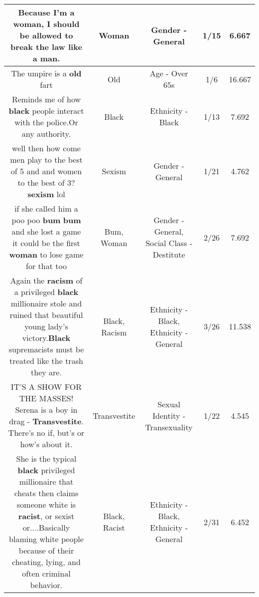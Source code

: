 \documentclass[11pt]{article}
\newlength\mylength
\begin{document}
\begin{center}
\begin{longtable}{|C{.65\mylength}|C{.30\mylength}|C{.12\mylength}|C{.12\mylength}|C{.12\mylength}|}
  \small Because I'm a \textbf{woman}, I should be allowed to break the law like a man.\normalsize   & Woman & Gender - General & 1/15 & 6.667 \\  \hline
  \small The umpire is a \textbf{old} fart\normalsize   & Old & Age - Over 65s & 1/6 & 16.667 \\  \hline
  \small Reminds me of how \textbf{black} people interact with the police.Or any authority.\normalsize   & Black & Ethnicity - Black & 1/13 & 7.692 \\  \hline
  \small well then how come men play to the best of 5 and and women to the best of 3? \textbf{sexism} lol\normalsize   & Sexism & Gender - General & 1/21 & 4.762 \\  \hline
  \small if she called him a poo poo \textbf{bum} \textbf{bum} and she lost a game it could be the first \textbf{woman} to lose game for that too\normalsize   & Bum, Woman & Gender - General, Social Class - Destitute & 2/26 & 7.692 \\  \hline
  \small Again the \textbf{racism} of a privileged \textbf{black} millionaire stole and ruined that beautiful young lady's victory.\textbf{Black} supremacists must be treated like the trash they are.\normalsize   & Black, Racism & Ethnicity - Black, Ethnicity - General & 3/26 & 11.538 \\  \hline
  \small IT'S A SHOW FOR THE MASSES! Serena is a boy in drag - \textbf{Transvestite}. There's no if, but's or how's about it.\normalsize   & Transvestite & Sexual Identity - Transexuality & 1/22 & 4.545 \\  \hline
  \small She is the typical \textbf{black} privileged millionaire that cheats then claims someone white is \textbf{racist}, or sexist  or....Basically blaming white people because of their cheating, lying, and often criminal behavior.\normalsize   & Black, Racist & Ethnicity - Black, Ethnicity - General & 2/31 & 6.452 \\  \hline

\end{longtable}
\end{center}
\end{document}
